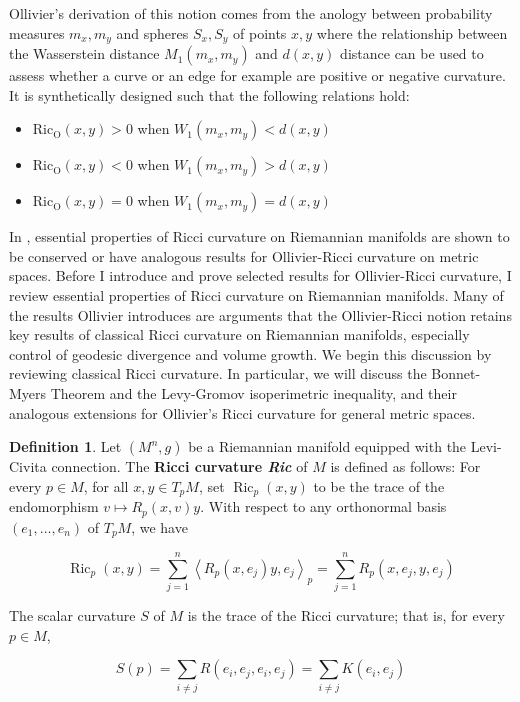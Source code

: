 \documentclass{Dissertate}
\theoremstyle{definition}
\theoremstyle{definition} %
\theoremstyle{definition}
\newtheorem{definition}[theorem]{Definition}
\begin{document}
Ollivier's derivation of this notion comes from the anology between probability measures $m_x, m_y$ and spheres $S_x, S_y$ of points $x,y$ where the relationship between the Wasserstein distance $M_1(m_x,m_y)$ and $d(x,y)$ distance can be used to assess whether a curve or an edge for example are positive or negative curvature. It is synthetically designed such that the following relations hold: 
\begin{itemize}
    \item $\operatorname{Ric_O}(x,y) > 0$  when $W_1(m_x,m_y) < d(x,y)$
    \item $\operatorname{Ric_O}(x,y) < 0$  when $W_1(m_x,m_y) > d(x,y)$
    \item $\operatorname{Ric_O}(x,y) = 0$ when $W_1(m_x,m_y) = d(x,y)$
\end{itemize}
In \cite{ollivier_ricci_2009}, essential properties of Ricci curvature on Riemannian manifolds are shown to be conserved or have analogous results for Ollivier-Ricci curvature on metric spaces. Before I introduce and prove selected results for Ollivier-Ricci curvature, I review essential properties of Ricci curvature on Riemannian manifolds. Many of the results Ollivier introduces are arguments that the Ollivier-Ricci notion retains key results  of classical Ricci curvature on Riemannian manifolds, especially control of geodesic divergence and volume growth. We begin this discussion by reviewing classical Ricci curvature. In particular, we will discuss the Bonnet-Myers Theorem and the  Levy-Gromov isoperimetric inequality, and their analogous extensions for Ollivier's Ricci curvature for general metric spaces. 
\begin{definition}
Let $(M^n,g)$ be a Riemannian manifold equipped with the Levi-Civita connection. The \textbf{Ricci curvature \textit{Ric}} of $M$ is defined as follows: For every $p \in M$, for all $x, y \in T_{p} M$, set $\operatorname{Ric}_{p}(x, y)$ to be the trace of the endomorphism $v \mapsto R_{p}(x, v) y$. With respect to any orthonormal basis $\left(e_{1}, \ldots, e_{n}\right)$ of $T_{p} M$, we have

$$
\operatorname{Ric}_{p}(x, y)=\sum_{j=1}^{n}\left\langle R_{p}\left(x, e_{j}\right) y, e_{j}\right\rangle_{p}=\sum_{j=1}^{n} R_{p}\left(x, e_{j}, y, e_{j}\right)
$$
\end{definition}


The scalar curvature $S$ of $M$ is the trace of the Ricci curvature; that is, for every $p \in M$,

$$
S(p)=\sum_{i \neq j} R\left(e_{i}, e_{j}, e_{i}, e_{j}\right)=\sum_{i \neq j} K\left(e_{i}, e_{j}\right)
$$
\end{document}
